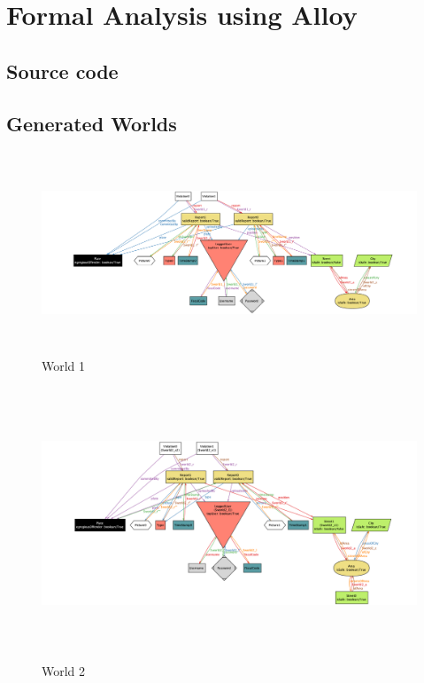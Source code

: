 \setlength{\parindent}{4ex}
\setlength{\parskip}{1ex}

\section{Formal Analysis using Alloy}

\subsection{Source code}
		
		
\subsection{Generated Worlds}

\begin{figure}[h!]
	\centering
	\includegraphics [height=170pt,angle=-90]{alloy/world1.png}
	\caption{
		\label{fig:World1} 
		World 1
	}
\end{figure}

\begin{figure}[h!]
	\centering
	\includegraphics [height=230pt,angle=-90]{alloy/world2.png}
	\caption{
		\label{fig:World2} 
		World 2
	}
\end{figure}

